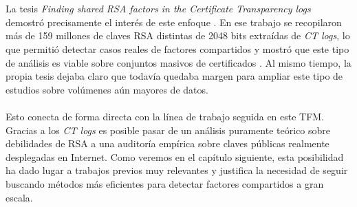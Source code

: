 \\
\\
La tesis \textit{Finding shared RSA factors in the Certificate Transparency logs} demostró precisamente el interés de este enfoque \cite{vage2022finding}. En ese trabajo se recopilaron más de 159 millones de claves RSA distintas de 2048 bits extraídas de \textit{CT logs}, lo que permitió detectar casos reales de factores compartidos y mostró que este tipo de análisis es viable sobre conjuntos masivos de certificados \cite{vage2022finding}. Al mismo tiempo, la propia tesis dejaba claro que todavía quedaba margen para ampliar este tipo de estudios sobre volúmenes aún mayores de datos.
\\
\\
Esto conecta de forma directa con la línea de trabajo seguida en este TFM. Gracias a los \textit{CT logs} es posible pasar de un análisis puramente teórico sobre debilidades de RSA a una auditoría empírica sobre claves públicas realmente desplegadas en Internet. Como veremos en el capítulo siguiente, esta posibilidad ha dado lugar a trabajos previos muy relevantes y justifica la necesidad de seguir buscando métodos más eficientes para detectar factores compartidos a gran escala.